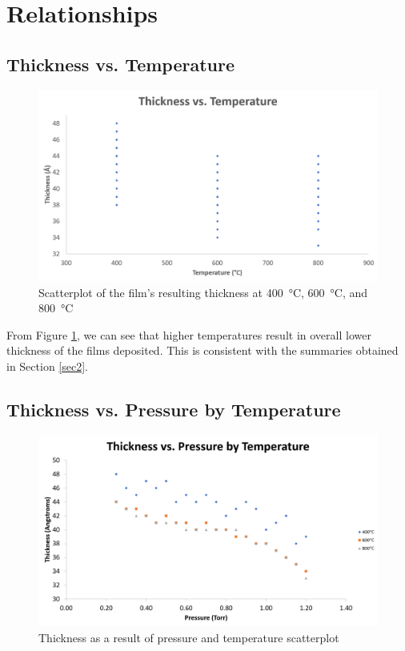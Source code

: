 \documentclass[letterpaper]{article}
\begin{document}
\section{Relationships}

\subsection{Thickness vs. Temperature}

\begin{figure}[H]
 \centering
 \includegraphics[width=\textwidth]{thiccvstemp.png}
 \caption{Scatterplot of the film's resulting thickness at \SI{400}{\celsius}, \SI{600}{\celsius}, and \SI{800}{\celsius}}
 \label{thiccvstemp}
\end{figure}

From Figure \ref{thiccvstemp}, we can see that higher temperatures result in
overall lower thickness of the films deposited. This is consistent with the summaries
obtained in Section \ref{sec2}.

\subsection{Thickness vs. Pressure by Temperature}

\begin{figure}[H]
 \centering
 \includegraphics[width=\textwidth]{thiccvspressurebytemp.png}
 \caption{Thickness as a result of pressure and temperature scatterplot}
 \label{thiccvspressurebytemp}
\end{figure}
\end{document}
